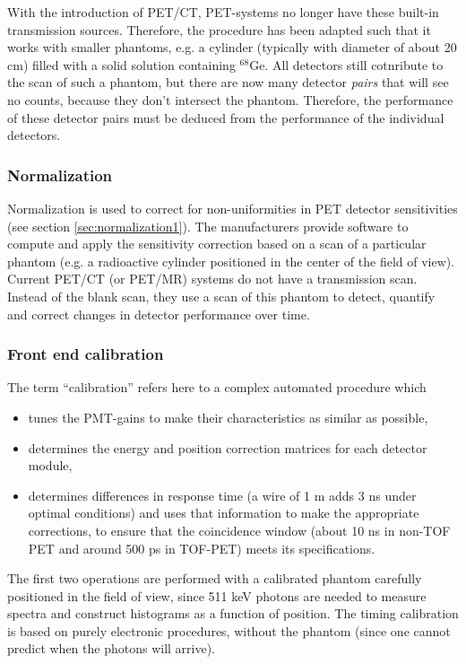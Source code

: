 \documentclass[11pt,oneside]{article}
\begin{document}
With the introduction of PET/CT, PET-systems no longer have these
built-in transmission sources. Therefore, the procedure has been
adapted such that it works with smaller phantoms, e.g. a cylinder
(typically with diameter of about 20 cm) filled with a solid solution
containing $^{68}$Ge. All detectors still cotnribute to the scan of
such a phantom, but there are now many detector {\em pairs} that will
see no counts, because they don't intersect the phantom. Therefore,
the performance of these detector pairs must be deduced from the
performance of the individual detectors.


\subsubsection{Normalization}
Normalization is used to correct for non-uniformities in PET detector
sensitivities (see section \ref{sec:normalization1}). The
manufacturers provide software to compute and apply the sensitivity
correction based on a scan of a particular phantom (e.g. a radioactive
cylinder positioned in the center of the field of view). Current
PET/CT (or PET/MR) systems do not have a transmission scan. Instead of
the blank scan, they use a scan of this phantom to detect, quantify
and correct changes in detector performance over time.

\subsubsection{Front end calibration}
The term ``calibration'' refers here to a complex automated procedure
which
\begin{itemize}
  \item tunes the PMT-gains to make their characteristics as similar as
        possible,
  \item determines the energy and position correction matrices for each
        detector module,
  \item determines differences in response time (a wire of 1 m adds 3
        ns under optimal conditions) and uses that information to make
        the appropriate corrections, to ensure that the coincidence
        window (about 10 ns in non-TOF PET and around 500 ps in
        TOF-PET) meets its specifications.
\end{itemize}
The first two operations are performed with a calibrated phantom carefully
positioned in the field of view, since 511 keV photons are needed to measure
spectra and construct histograms as a function of position. The timing
calibration is based on purely electronic procedures, without the phantom
(since one cannot predict when the photons will arrive).
\end{document}
